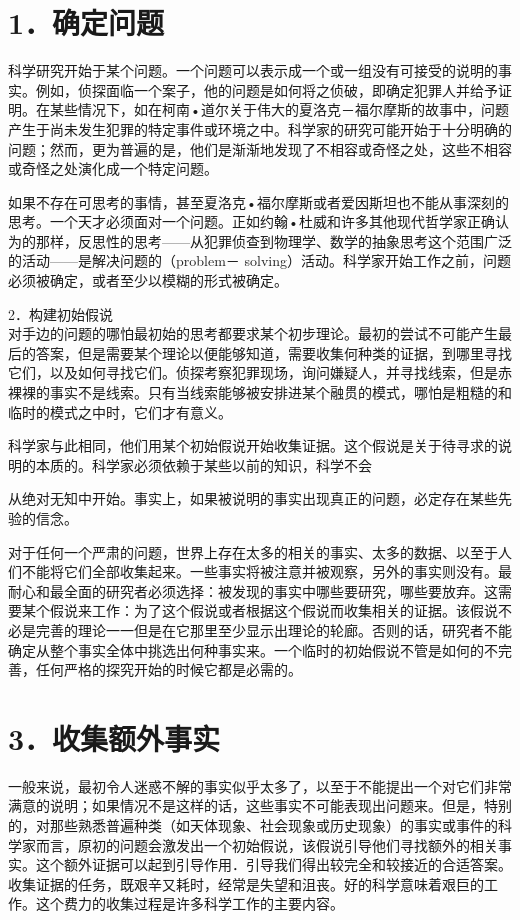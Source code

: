 \section*{1．确定问题}
科学研究开始于某个问题。一个问题可以表示成一个或一组没有可接受的说明的事实。例如，侦探面临一个案子，他的问题是如何将之侦破，即确定犯罪人并给予证明。在某些情况下，如在柯南•道尔关于伟大的夏洛克－福尔摩斯的故事中，问题产生于尚未发生犯罪的特定事件或环境之中。科学家的研究可能开始于十分明确的问题；然而，更为普遍的是，他们是渐渐地发现了不相容或奇怪之处，这些不相容或奇怪之处演化成一个特定问题。

如果不存在可思考的事情，甚至夏洛克•福尔摩斯或者爱因斯坦也不能从事深刻的思考。一个天才必须面对一个问题。正如约翰•杜威和许多其他现代哲学家正确认为的那样，反思性的思考——从犯罪侦查到物理学、数学的抽象思考这个范围广泛的活动——是解决问题的（problem－ solving）活动。科学家开始工作之前，问题必须被确定，或者至少以模糊的形式被确定。

2．构建初始假说\\
对手边的问题的哪怕最初始的思考都要求某个初步理论。最初的尝试不可能产生最后的答案，但是需要某个理论以便能够知道，需要收集何种类的证据，到哪里寻找它们，以及如何寻找它们。侦探考察犯罪现场，询问嫌疑人，并寻找线索，但是赤裸裸的事实不是线索。只有当线索能够被安排进某个融贯的模式，哪怕是粗糙的和临时的模式之中时，它们才有意义。

科学家与此相同，他们用某个初始假说开始收集证据。这个假说是关于待寻求的说明的本质的。科学家必须依赖于某些以前的知识，科学不会

从绝对无知中开始。事实上，如果被说明的事实出现真正的问题，必定存在某些先验的信念。

对于任何一个严肃的问题，世界上存在太多的相关的事实、太多的数据、以至于人们不能将它们全部收集起来。一些事实将被注意并被观察，另外的事实则没有。最耐心和最全面的研究者必须选择：被发现的事实中哪些要研究，哪些要放弃。这需要某个假说来工作：为了这个假说或者根据这个假说而收集相关的证据。该假说不必是完善的理论一一但是在它那里至少显示出理论的轮廊。否则的话，研究者不能确定从整个事实全体中挑选出何种事实来。一个临时的初始假说不管是如何的不完善，任何严格的探究开始的时候它都是必需的。

\section*{3．收集额外事实}
一般来说，最初令人迷惑不解的事实似乎太多了，以至于不能提出一个对它们非常满意的说明；如果情况不是这样的话，这些事实不可能表现出问题来。但是，特别的，对那些熟悉普遍种类（如天体现象、社会现象或历史现象）的事实或事件的科学家而言，原初的问题会激发出一个初始假说，该假说引导他们寻找额外的相关事实。这个额外证据可以起到引导作用．引导我们得出较完全和较接近的合适答案。收集证据的任务，既艰辛又耗时，经常是失望和沮丧。好的科学意味着艰巨的工作。这个费力的收集过程是许多科学工作的主要内容。


